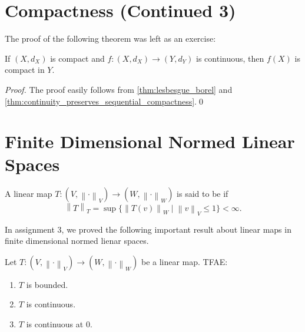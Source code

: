 \documentclass[notoc,notitlepage]{tufte-book}
\newcommand{\norm}[1]{\left\| #1 \right\|}
\begin{document}
\section{Compactness (Continued 3)}%
\label{sec:compactness_continued_3}

The proof of the following theorem was left as an exercise:

\begin{thm}\label{thm:continuity_preserves_compactness}
  If $(X, d_X)$ is compact and $f : (X, d_X) \to (Y, d_Y)$ is continuous, then $f(X)$ is compact in $Y$.
\end{thm}

\begin{proof}
  The proof easily follows from \cref{thm:lesbesgue_borel} and \cref{thm:continuity_preserves_sequential_compactness}.\qed\
\end{proof}


\section{Finite Dimensional Normed Linear Spaces}%
\label{sec:finite_dimensional_normed_linear_spaces}

\begin{defn}[Bounded Linear Map]\label{defn:bounded_linear_map}
  A linear map $T : (V, \norm\cdot_V) \to (W, \norm\cdot_W)$ is said to be  if
  \begin{equation*}
    \norm{T}_T = \sup \{ \norm{T(v)}_W \mid \norm{v}_V \leq 1 \} < \infty.
  \end{equation*}
\end{defn}

In assignment 3, we proved the following important result about linear maps in finite dimensional normed lienar spaces.

\begin{thm}\label{thm:boundedness_is_equivalent_to_continuity_in_finite_dimensional_normed_linear_spaces}
  Let $T : ( V, \norm\cdot_V ) \to (W, \norm\cdot_W)$ be a linear map. TFAE:
  \begin{enumerate}
    \item $T$ is bounded.
    \item $T$ is continuous.
    \item $T$ is continuous at $0$.
  \end{enumerate}
\end{thm}
\end{document}
